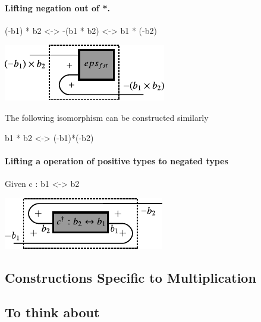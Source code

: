 \documentclass[preprint]{sigplanconf}
\begin{document}
\paragraph*{Lifting negation out of {{*}}. }

{{(-b1) * b2 <-> -(b1 * b2) <-> b1 * (-b2)}}

\begin{center}
  \includegraphics{diagrams/mult_neg.pdf}
\end{center}

The following isomorphism can be constructed similarly 

{{b1 * b2 <-> (-b1)*(-b2)}}


\paragraph*{Lifting a operation of positive types to negated types}

Given {{c : b1 <-> b2}}

\begin{center}
  \includegraphics{diagrams/neg_lift.pdf}
\end{center}


\subsection{Constructions Specific to Multiplication}


\subsection{To think about}
\end{document}
